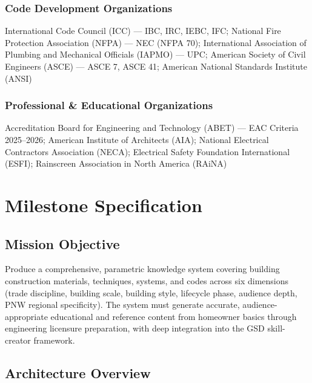 \documentclass[11pt,letterpaper]{article}
\newcommand{\stageheader}[2]{%
  \noindent\colorbox{#2}{\makebox[\textwidth][l]{%
    \textcolor{white}{\bfseries\sffamily\hspace{6pt}#1\hspace{6pt}}}}%
  \vspace{0.5em}\par%
}
\begin{document}
\subsubsection{Code Development Organizations}

International Code Council (ICC) --- IBC, IRC, IEBC, IFC; National Fire Protection Association (NFPA) --- NEC (NFPA 70); International Association of Plumbing and Mechanical Officials (IAPMO) --- UPC; American Society of Civil Engineers (ASCE) --- ASCE 7, ASCE 41; American National Standards Institute (ANSI)

\subsubsection{Professional \& Educational Organizations}

Accreditation Board for Engineering and Technology (ABET) --- EAC Criteria 2025--2026; American Institute of Architects (AIA); National Electrical Contractors Association (NECA); Electrical Safety Foundation International (ESFI); Rainscreen Association in North America (RAiNA)

\newpage

\stageheader{STAGE 3 --- MISSION PACKAGE}{tertiary}

\section{Milestone Specification}

\subsection{Mission Objective}

Produce a comprehensive, parametric knowledge system covering building construction materials, techniques, systems, and codes across six dimensions (trade discipline, building scale, building style, lifecycle phase, audience depth, PNW regional specificity). The system must generate accurate, audience-appropriate educational and reference content from homeowner basics through engineering licensure preparation, with deep integration into the GSD skill-creator framework.

\subsection{Architecture Overview}
\end{document}

